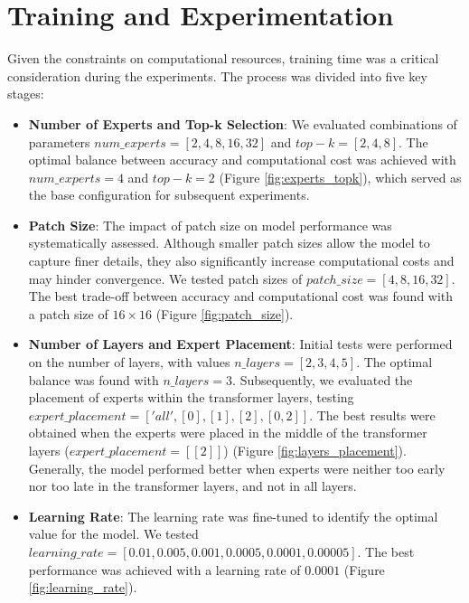 \documentclass[a4paper,11pt]{article}
\begin{document}
\section{Training and Experimentation}
Given the constraints on computational resources, training time was a critical consideration during the experiments. The process was divided into five key stages:

\begin{itemize}
    \item \textbf{Number of Experts and Top-k Selection}: 
    We evaluated combinations of parameters $num\_experts = [2, 4, 8, 16, 32]$ and $top-k = [2, 4, 8]$. The optimal balance between accuracy and computational cost was achieved with $num\_experts = 4$ and $top-k = 2$ (Figure \ref{fig:experts_topk}), which served as the base configuration for subsequent experiments.

    
    \item \textbf{Patch Size}: The impact of patch size on model performance was systematically assessed. Although smaller patch sizes allow the model to capture finer details, they also significantly increase computational costs and may hinder convergence. We tested patch sizes of $patch\_size = [4, 8, 16, 32]$. The best trade-off between accuracy and computational cost was found with a patch size of $16 \times 16$ (Figure \ref{fig:patch_size}).


    \item \textbf{Number of Layers and Expert Placement}: Initial tests were performed on the number of layers, with values $n\_layers = [2, 3, 4, 5]$. The optimal balance was found with $n\_layers = 3$. Subsequently, we evaluated the placement of experts within the transformer layers, testing $expert\_placement = ['all', [0], [1], [2], [0, 2]]$. The best results were obtained when the experts were placed in the middle of the transformer layers ($expert\_placement = [[2]]$) (Figure \ref{fig:layers_placement}). Generally, the model performed better when experts were neither too early nor too late in the transformer layers, and not in all layers.


    \item \textbf{Learning Rate}: The learning rate was fine-tuned to identify the optimal value for the model. We tested $learning\_rate = [0.01, 0.005, 0.001, 0.0005, 0.0001, 0.00005]$. The best performance was achieved with a learning rate of $0.0001$ (Figure \ref{fig:learning_rate}).


\end{itemize}
\end{document}
